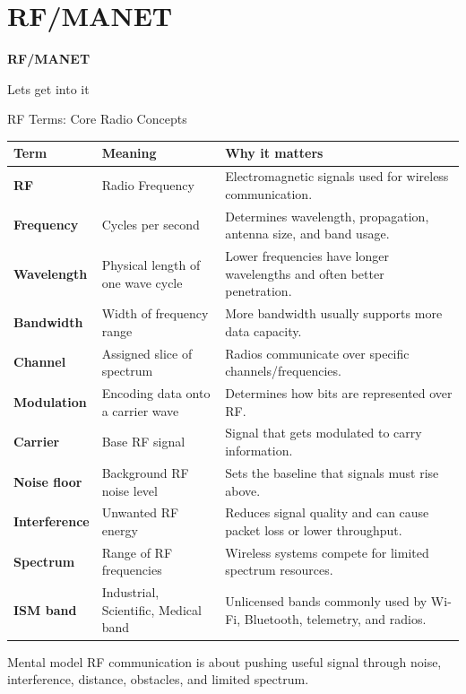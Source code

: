 \documentclass[aspectratio=169]{beamer}
\begin{document}
\section{RF/MANET}

\begin{frame}
    \centering
    \vfill

    {\Huge \textbf{RF/MANET}}

    \vspace{0.4cm}

    {\Large Lets get into it}

    \vfill
\end{frame}


\begin{frame}{RF Terms: Core Radio Concepts}
\tiny
\begin{tabular}{p{2.0cm} p{3.4cm} p{6.7cm}}
\toprule
\textbf{Term} & \textbf{Meaning} & \textbf{Why it matters} \\
\midrule
\textbf{RF} & Radio Frequency & Electromagnetic signals used for wireless communication. \\
\textbf{Frequency} & Cycles per second & Determines wavelength, propagation, antenna size, and band usage. \\
\textbf{Wavelength} & Physical length of one wave cycle & Lower frequencies have longer wavelengths and often better penetration. \\
\textbf{Bandwidth} & Width of frequency range & More bandwidth usually supports more data capacity. \\
\textbf{Channel} & Assigned slice of spectrum & Radios communicate over specific channels/frequencies. \\
\textbf{Modulation} & Encoding data onto a carrier wave & Determines how bits are represented over RF. \\
\textbf{Carrier} & Base RF signal & Signal that gets modulated to carry information. \\
\textbf{Noise floor} & Background RF noise level & Sets the baseline that signals must rise above. \\
\textbf{Interference} & Unwanted RF energy & Reduces signal quality and can cause packet loss or lower throughput. \\
\textbf{Spectrum} & Range of RF frequencies & Wireless systems compete for limited spectrum resources. \\
\textbf{ISM band} & Industrial, Scientific, Medical band & Unlicensed bands commonly used by Wi-Fi, Bluetooth, telemetry, and radios. \\
\bottomrule
\end{tabular}

\vspace{0.15cm}
\begin{block}{Mental model}
RF communication is about pushing useful signal through noise, interference, distance, obstacles, and limited spectrum.
\end{block}
\end{frame}
\end{document}
